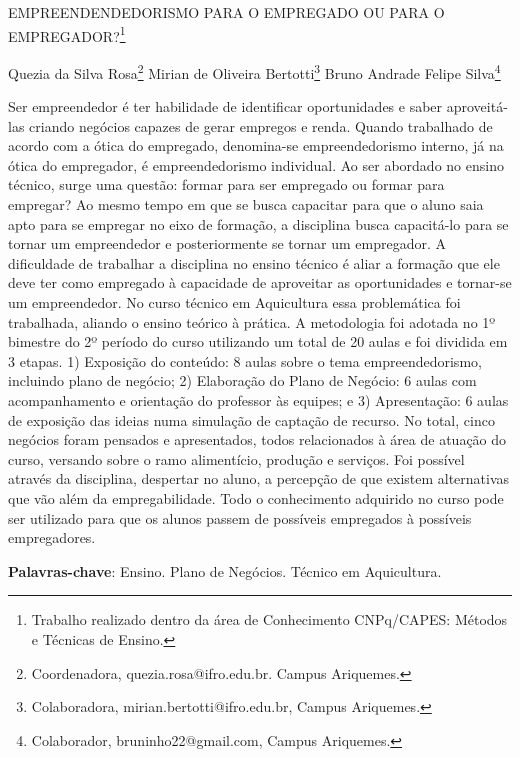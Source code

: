 \documentclass[article,12pt,onesidea,4paper,english,brazil]{abntex2}
\begin{document}
	
	
	\frenchspacing 
	
	\begin{center}
		\LARGE EMPREENDENDEDORISMO PARA O EMPREGADO OU PARA O EMPREGADOR?\footnote{Trabalho realizado dentro da área de Conhecimento CNPq/CAPES: Métodos e Técnicas de Ensino.}
		
		\normalsize
		Quezia da Silva Rosa\footnote{Coordenadora, quezia.rosa@ifro.edu.br. Campus Ariquemes.} 
	Mirian de Oliveira Bertotti\footnote{Colaboradora, mirian.bertotti@ifro.edu.br, Campus Ariquemes.} 
		Bruno Andrade Felipe Silva\footnote{Colaborador, bruninho22@gmail.com, Campus Ariquemes.} 
	\end{center}
	
	\noindent Ser empreendedor é ter habilidade de identificar oportunidades e saber aproveitá-las
	criando negócios capazes de gerar empregos e renda. Quando trabalhado de
	acordo com a ótica do empregado, denomina-se empreendedorismo interno, já na
	ótica do empregador, é empreendedorismo individual. Ao ser abordado no ensino
	técnico, surge uma questão: formar para ser empregado ou formar para empregar?
	Ao mesmo tempo em que se busca capacitar para que o aluno saia apto para se
	empregar no eixo de formação, a disciplina busca capacitá-lo para se tornar um
	empreendedor e posteriormente se tornar um empregador. A dificuldade de trabalhar
	a disciplina no ensino técnico é aliar a formação que ele deve ter como empregado à
	capacidade de aproveitar as oportunidades e tornar-se um empreendedor. No curso
	técnico em Aquicultura essa problemática foi trabalhada, aliando o ensino teórico à
	prática. A metodologia foi adotada no 1º bimestre do 2º período do curso utilizando
	um total de 20 aulas e foi dividida em 3 etapas. 1) Exposição do conteúdo: 8 aulas
	sobre o tema empreendedorismo, incluindo plano de negócio; 2) Elaboração do
	Plano de Negócio: 6 aulas com acompanhamento e orientação do professor às
	equipes; e 3) Apresentação: 6 aulas de exposição das ideias numa simulação de
	captação de recurso. No total, cinco negócios foram pensados e apresentados,
	todos relacionados à área de atuação do curso, versando sobre o ramo alimentício,
	produção e serviços. Foi possível através da disciplina, despertar no aluno, a
	percepção de que existem alternativas que vão além da empregabilidade. Todo o
	conhecimento adquirido no curso pode ser utilizado para que os alunos passem de
	possíveis empregados à possíveis empregadores.
	
	\vspace{\onelineskip}
	
	\noindent
	\textbf{Palavras-chave}: Ensino. Plano de Negócios. Técnico em Aquicultura.
	
\end{document}
